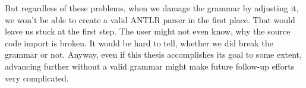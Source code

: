 But regardless of these problems, when we damage the grammar by adjusting it, we won't be able to create a valid ANTLR parser in the first place.
That would leave us stuck at the first step.
The user might not even know, why the source code import is broken.
It would be hard to tell, whether we did break the grammar or not.
Anyway, even if this thesis accomplishes its goal to some extent, advancing further without a valid grammar might make future follow-up efforts very complicated.
